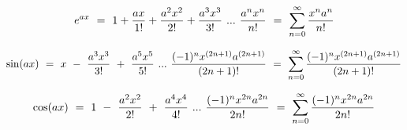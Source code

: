 \documentclass{article}
\begin{document}
\begin{equation} \label{eb-eq-224-1}
e^{ax} \hspace{0.125cm} = \hspace{0.125cm} 1 + \frac{ax}{1!} + \frac{a^2x^2}{2!} + \frac{a^3x^3}{3!} \hspace{0.125cm} ... \hspace{0.125cm} \frac{a^{n}x^{n}}{n!} \hspace{0.125cm} = \hspace{0.125cm} \sum_{n=0}^{\infty} \frac{x^{n}a^{n}}{n!}
\end{equation}

\begin{equation} \label{eb-eq-225-1}
\sin(ax) \hspace{0.125cm} = \hspace{0.125cm} x \hspace{0.125cm} - \hspace{0.125cm} \frac{a^3x^3}{3!} \hspace{0.125cm} + \hspace{0.125cm} \frac{a^5x^5}{5!} \hspace{0.125cm} ... \hspace{0.125cm} \frac{(-1)^{n}x^{(2n+1)}a^{(2n+1)}}{(2n+1)!} \hspace{0.125cm} = \hspace{0.125cm} \sum_{n=0}^{\infty} \frac{(-1)^{n}x^{(2n+1)}a^{(2n+1)}}{(2n+1)!}
\end{equation}

\begin{equation} \label{eb-eq-226-1}
\cos(ax) \hspace{0.125cm} = \hspace{0.125cm} 1 \hspace{0.125cm} - \hspace{0.125cm} \frac{a^2x^2}{2!} \hspace{0.125cm} + \hspace{0.125cm} \frac{a^4x^4}{4!} \hspace{0.125cm} ... \hspace{0.125cm} \frac{(-1)^{n}x^{2n}a^{2n}}{2n!} \hspace{0.125cm} = \hspace{0.125cm} \sum_{n=0}^{\infty} \frac{(-1)^{n}x^{2n}a^{2n}}{2n!}
\end{equation}
\end{document}
